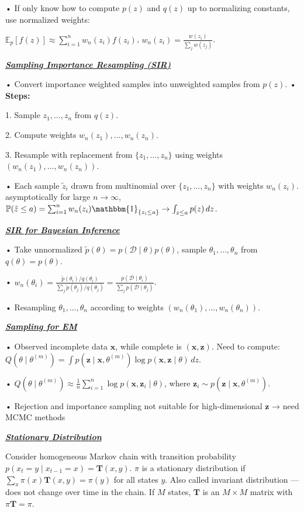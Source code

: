 \documentclass[10pt]{article}
\newcommand{\bulletPoint}[1]{\ul{\textit{\textbf{#1}}}}
\begin{document}
\begin{multicols*}{3}
• If only know how to compute $p(z)$ and $q(z)$ up to normalizing constants, use normalized weights:   

$\mathbb{E}_p[f(z)] \approx \sum_{i=1}^n w_n(z_i)f(z_i)$, $w_n(z_i) = \frac{w(z_i)}{\sum_j w(z_j)}$.

\bulletPoint{Sampling Importance Resampling (SIR)}\quad

• Convert importance weighted samples into unweighted samples from $p(z)$. \quad
• \textbf{Steps:}

1. Sample $z_1,\dots,z_n$ from $q(z)$. 

2. Compute weights $w_n(z_1),\dots,w_n(z_n)$.

3. Resample with replacement from $\{z_1,\dots,z_n\}$ using weights $(w_n(z_1),\dots,w_n(z_n))$. 

• Each sample $\tilde{z}_i$ drawn from multinomial over $\{z_1,\dots,z_n\}$ with weights $w_n(z_i)$. 
asymptotically for large $n\to\infty$, 
$\mathbb{P}(\tilde{z} \leq a) = \sum_{i=1}^n w_n(z_i)\mathbbm{1}_{\{z_i \leq a\}} \to \int_{z \leq a} p(z)\,dz$. 

\bulletPoint{SIR for Bayesian Inference}\quad

• Take unnormalized $\tilde{p}(\theta) = p(\mathcal{D} \mid \theta)p(\theta)$, sample $\theta_1,\dots,\theta_n$ from $q(\theta) = p(\theta)$. 

• $w_n(\theta_i) = \frac{\tilde{p}(\theta_i)/q(\theta_i)}{\sum_j \tilde{p}(\theta_j)/q(\theta_j)} = \frac{p(\mathcal{D} \mid \theta_i)}{\sum_j p(\mathcal{D} \mid \theta_j)}$. 

• Resampling $\theta_1,\dots,\theta_n$ according to weights $(w_n(\theta_1),\dots,w_n(\theta_n))$. 

\bulletPoint{Sampling for EM}\quad

• Observed incomplete data $\mathbf{x}$, while complete is $\mathbf{(x,z)}$. 
Need to compute:
$Q(\theta \mid \theta^{(m)}) = \int p(\mathbf{z} \mid \mathbf{x}, \theta^{(m)}) \log p(\mathbf{x}, \mathbf{z} \mid \theta)\,dz$. 

• $Q(\theta \mid \theta^{(m)}) \approx \frac{1}{n} \sum_{i=1}^n \log p(\mathbf{x}, \mathbf{z}_i \mid \theta)$, where $\mathbf{z}_i \sim p(\mathbf{z} \mid \mathbf{x}, \theta^{(m)})$. 

• Rejection and importance sampling not suitable for high-dimensional $\mathbf{z}$ → need MCMC methods

\bulletPoint{Stationary Distribution}\quad

Consider homogeneous Markov chain with transition probability $p(x_t = y \mid x_{t-1} = x) = \mathbf{T}(x, y)$. 
$\pi$ is a stationary distribution if $\sum_x \pi(x)\mathbf{T}(x, y) = \pi(y)$ for all states $y$. 
Also called invariant distribution — does not change over time in the chain. 
If $M$ states, $\mathbf{T}$ is an $M \times M$ matrix with $\pi \mathbf{T} = \pi$. 


\end{multicols*}
\end{document}
